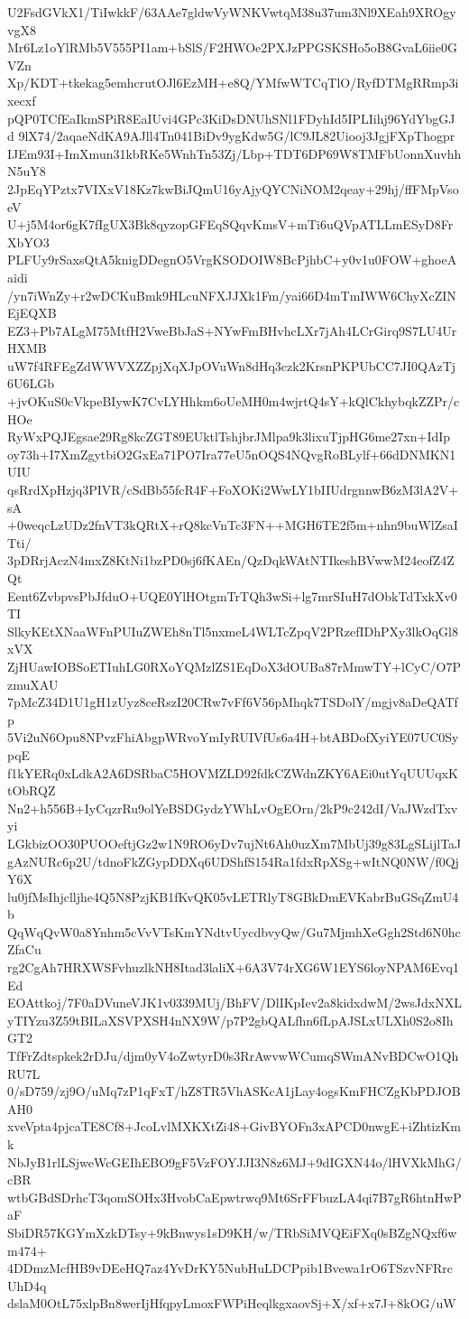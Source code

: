 U2FsdGVkX1/TiIwkkF/63AAe7gldwVyWNKVwtqM38u37um3Nl9XEah9XROgyvgX8
Mr6Lz1oYlRMb5V555PI1am+bSlS/F2HWOe2PXJzPPGSKSHo5oB8GvaL6iie0GVZn
Xp/KDT+tkekag5emhcrutOJl6EzMH+e8Q/YMfwWTCqTlO/RyfDTMgRRmp3ixecxf
pQP0TCfEaIkmSPiR8EaIUvi4GPc3KiDsDNUhSNl1FDyhId5IPLIihj96YdYbgGJd
9lX74/2aqaeNdKA9AJll4Tn041BiDv9ygKdw5G/lC9JL82Uiooj3JgjFXpThogpr
IJEm93I+ImXmun31kbRKe5WnhTn53Zj/Lbp+TDT6DP69W8TMFbUonnXuvhhN5uY8
2JpEqYPztx7VIXxV18Kz7kwBiJQmU16yAjyQYCNiNOM2qeay+29hj/ffFMpVsoeV
U+j5M4or6gK7fIgUX3Bk8qyzopGFEqSQqvKmsV+mTi6uQVpATLLmESyD8FrXbYO3
PLFUy9rSaxsQtA5knigDDegnO5VrgKSODOIW8BcPjhbC+y0v1u0FOW+ghoeAaidi
/yn7iWnZy+r2wDCKuBmk9HLcuNFXJJXk1Fm/yai66D4mTmIWW6ChyXcZINEjEQXB
EZ3+Pb7ALgM75MtfH2VweBbJaS+NYwFmBHvhcLXr7jAh4LCrGirq9S7LU4UrHXMB
uW7f4RFEgZdWWVXZZpjXqXJpOVuWn8dHq3czk2KrsnPKPUbCC7JI0QAzTj6U6LGb
+jvOKuS0cVkpeBIywK7CvLYHhkm6oUeMH0m4wjrtQ4sY+kQlCkhybqkZZPr/cHOe
RyWxPQJEgsae29Rg8kcZGT89EUktlTshjbrJMlpa9k3lixuTjpHG6me27xn+IdIp
oy73h+I7XmZgytbiO2GxEa71PO7Ira77eU5nOQS4NQvgRoBLylf+66dDNMKN1UIU
qsRrdXpHzjq3PIVR/cSdBb55fcR4F+FoXOKi2WwLY1bIIUdrgnnwB6zM3lA2V+sA
+0weqcLzUDz2fnVT3kQRtX+rQ8kcVnTc3FN++MGH6TE2f5m+nhn9buWlZsaITti/
3pDRrjAczN4mxZ8KtNi1bzPD0sj6fKAEn/QzDqkWAtNTIkeshBVwwM24eofZ4ZQt
Eent6ZvbpvsPbJfduO+UQE0YlHOtgmTrTQh3wSi+lg7mrSIuH7dObkTdTxkXv0TI
SlkyKEtXNaaWFnPUIuZWEh8nTl5nxmeL4WLTcZpqV2PRzefIDhPXy3lkOqGl8xVX
ZjHUawIOBSoETIuhLG0RXoYQMzlZS1EqDoX3dOUBa87rMmwTY+lCyC/O7PzmuXAU
7pMcZ34D1U1gH1zUyz8ceRszI20CRw7vFf6V56pMhqk7TSDolY/mgjv8aDeQATfp
5Vi2uN6Opu8NPvzFhiAbgpWRvoYmIyRUIVfUs6a4H+btABDofXyiYE07UC0SypqE
f1kYERq0xLdkA2A6DSRbaC5HOVMZLD92fdkCZWdnZKY6AEi0utYqUUUqxKtObRQZ
Nn2+h556B+IyCqzrRu9olYeBSDGydzYWhLvOgEOrn/2kP9c242dI/VaJWzdTxvyi
LGkbizOO30PUOOeftjGz2w1N9RO6yDv7ujNt6Ah0uzXm7MbUj39g83LgSLijlTaJ
gAzNURc6p2U/tdnoFkZGypDDXq6UDShfS154Ra1fdxRpXSg+wItNQ0NW/f0QjY6X
lu0jfMsIhjclljhe4Q5N8PzjKB1fKvQK05vLETRlyT8GBkDmEVKabrBuGSqZmU4b
QqWqQvW0a8Ynhm5cVvVTsKmYNdtvUycdbvyQw/Gu7MjmhXeGgh2Std6N0hcZfaCu
rg2CgAh7HRXWSFvhuzlkNH8Itad3laliX+6A3V74rXG6W1EYS6loyNPAM6Evq1Ed
EOAttkoj/7F0aDVuneVJK1v0339MUj/BhFV/DlIKpIev2a8kidxdwM/2wsJdxNXL
yTIYzu3Z59tBILaXSVPXSH4nNX9W/p7P2gbQALfhn6fLpAJSLxULXh0S2o8IhGT2
TfFrZdtspkek2rDJu/djm0yV4oZwtyrD0s3RrAwvwWCumqSWmANvBDCwO1QhRU7L
0/sD759/zj9O/uMq7zP1qFxT/hZ8TR5VhASKcA1jLay4ogsKmFHCZgKbPDJOBAH0
xveVpta4pjcaTE8Cf8+JcoLvlMXKXtZi48+GivBYOFn3xAPCD0nwgE+iZhtizKmk
NbJyB1rlLSjweWcGEIhEBO9gF5VzFOYJJI3N8z6MJ+9dIGXN44o/lHVXkMhG/cBR
wtbGBdSDrhcT3qomSOHx3HvobCaEpwtrwq9Mt6SrFFbuzLA4qi7B7gR6htnHwPaF
SbiDR57KGYmXzkDTsy+9kBnwys1sD9KH/w/TRbSiMVQEiFXq0sBZgNQxf6wm474+
4DDmzMcfHB9vDEeHQ7az4YvDrKY5NubHuLDCPpib1Bvewa1rO6TSzvNFRrcUhD4q
dslaM0OtL75xlpBn8werIjHfqpyLmoxFWPiHeqlkgxaovSj+X/xf+x7J+8kOG/uW
